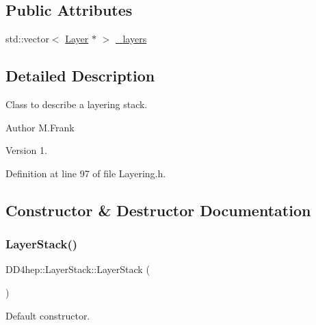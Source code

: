 \subsection*{Public Attributes}
\begin{DoxyCompactItemize}
\item 
std\+::vector$<$ \hyperlink{class_d_d4hep_1_1_layer}{Layer} $\ast$ $>$ \hyperlink{class_d_d4hep_1_1_layer_stack_a0e07d58da724e44b4d1c77120fb448d0}{\+\_\+layers}
\end{DoxyCompactItemize}


\subsection{Detailed Description}
Class to describe a layering stack. 

\begin{DoxyAuthor}{Author}
M.\+Frank 
\end{DoxyAuthor}
\begin{DoxyVersion}{Version}
1. 
\end{DoxyVersion}


Definition at line 97 of file Layering.\+h.



\subsection{Constructor \& Destructor Documentation}
\hypertarget{class_d_d4hep_1_1_layer_stack_a802229c0f548c9e506b8fa6544d54563}{}\label{class_d_d4hep_1_1_layer_stack_a802229c0f548c9e506b8fa6544d54563} 
\subsubsection{\texorpdfstring{Layer\+Stack()}{LayerStack()}\hspace{0.1cm}{\footnotesize\ttfamily [1/2]}}
{\footnotesize\ttfamily D\+D4hep\+::\+Layer\+Stack\+::\+Layer\+Stack (\begin{DoxyParamCaption}{ }\end{DoxyParamCaption})\hspace{0.3cm}{\ttfamily [inline]}}



Default constructor. 



